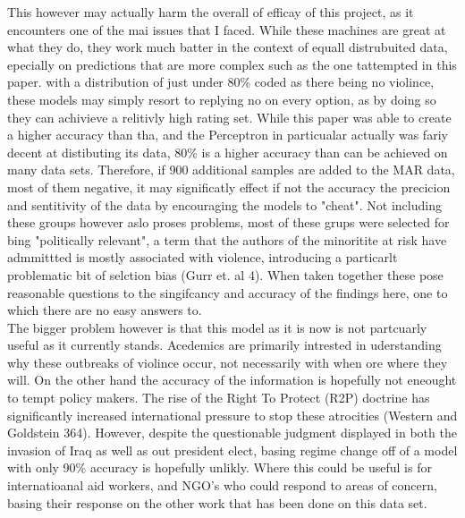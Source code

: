 \documentclass[12pt]{article}
\begin{document}
	This however may actually harm the overall of efficay of this project, as it encounters one of the mai issues that I faced. While these machines are great at what they do, they work much batter in the context of equall distrubuited data, epecially on predictions that are more complex such as the one tattempted in this paper. with a distribution of just under {80\%} coded as there being no violince, these models may simply resort to replying no on every option, as by doing so they can achivieve a relitivly high rating set. While this paper was able to create a higher accuracy than tha, and the Perceptron in particualar actually was fariy decent at distibuting its data, {80\%} is a higher accuracy than can be achieved on many data sets. Therefore, if 900 additional samples are added to the MAR data, most of them negative, it may significatly effect if not the accuracy the precicion and sentitivity of the data by encouraging the models to {"cheat"}. Not including these groups however aslo proses problems, most of these grups were selected for bing {"politically relevant"}, a term that the authors of the minoritite at risk have admmittted is mostly associated with violence, introducing a particarlt problematic bit of selction bias (Gurr et. al 4). When taken together these pose reasonable questions to the singifcancy and accuracy of the findings here, one to which there are no easy answers to. \\

	The bigger problem however is that this model as it is now is not partcuarly useful as it currently stands. Acedemics are primarily intrested in uderstanding why these outbreaks of violince occur, not necessarily with when ore where they will. On the other hand the accuracy of the information is hopefully not eneought to tempt policy makers. The rise of the Right To Protect (R2P) doctrine has significantly increased international pressure to stop these atrocities (Western and Goldstein 364). However, despite the questionable judgment displayed in both the invasion of Iraq as well as out president elect, basing regime change off of a model with only 90\% accuracy is hopefully unlikly. Where this could be useful is for internatioanal aid workers, and NGO's who could respond to areas of concern, basing their  response on the other work that has been done on this data set. \\
\end{document}
